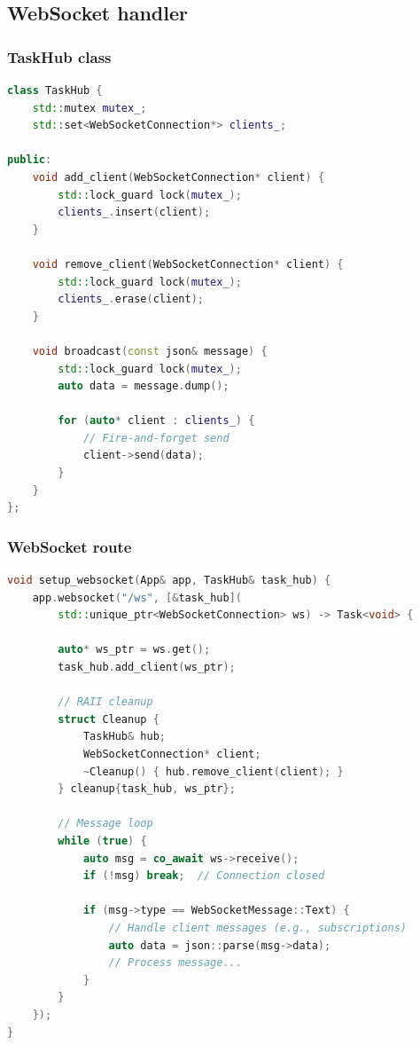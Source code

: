 \subsection{WebSocket handler}

\subsubsection{TaskHub class}

\begin{lstlisting}[language=C++, basicstyle=\small\ttfamily, caption={WebSocket TaskHub}]
class TaskHub {
    std::mutex mutex_;
    std::set<WebSocketConnection*> clients_;
    
public:
    void add_client(WebSocketConnection* client) {
        std::lock_guard lock(mutex_);
        clients_.insert(client);
    }
    
    void remove_client(WebSocketConnection* client) {
        std::lock_guard lock(mutex_);
        clients_.erase(client);
    }
    
    void broadcast(const json& message) {
        std::lock_guard lock(mutex_);
        auto data = message.dump();
        
        for (auto* client : clients_) {
            // Fire-and-forget send
            client->send(data);
        }
    }
};
\end{lstlisting}

\subsubsection{WebSocket route}

\begin{lstlisting}[language=C++, basicstyle=\small\ttfamily, caption={WebSocket route setup}]
void setup_websocket(App& app, TaskHub& task_hub) {
    app.websocket("/ws", [&task_hub](
        std::unique_ptr<WebSocketConnection> ws) -> Task<void> {
        
        auto* ws_ptr = ws.get();
        task_hub.add_client(ws_ptr);
        
        // RAII cleanup
        struct Cleanup {
            TaskHub& hub;
            WebSocketConnection* client;
            ~Cleanup() { hub.remove_client(client); }
        } cleanup{task_hub, ws_ptr};
        
        // Message loop
        while (true) {
            auto msg = co_await ws->receive();
            if (!msg) break;  // Connection closed
            
            if (msg->type == WebSocketMessage::Text) {
                // Handle client messages (e.g., subscriptions)
                auto data = json::parse(msg->data);
                // Process message...
            }
        }
    });
}
\end{lstlisting}


